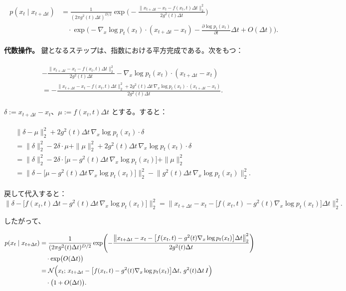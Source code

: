 \begin{align*}
\begin{aligned}
p(x_t\mid x_{t+\Delta t})
&= \frac{1}{(2\pi g^2(t)\Delta t)^{D/2}}
\exp\Biggl(
-\frac{\|x_{t+\Delta t}-x_t-f(x_t,t)\Delta t\|_2^2}{2g^2(t)\Delta t}
\Biggr) \\
&\quad\cdot\exp\Biggl(
-\nabla_x\log p_t(x_t)\cdot(x_{t+\Delta t}-x_t)
-\frac{\partial\log p_t(x_t)}{\partial t}\Delta t
+ O(\Delta t)
\Biggr).
\end{aligned}
\end{align*}


\textbf{代数操作。} 鍵となるステップは、指数における平方完成である。次をもつ：

\begin{align*}
\begin{aligned}
&-\frac{\|x_{t+\Delta t}-x_t-f(x_t,t)\Delta t\|_2^2}{2g^2(t)\Delta t}
-\nabla_x\log p_t(x_t)\cdot(x_{t+\Delta t}-x_t) \\
&= -\frac{
\bigl\|x_{t+\Delta t}-x_t-f(x_t,t)\Delta t\bigr\|_2^2
+ 2g^2(t)\Delta t\,\nabla_x\log p_t(x_t)\cdot(x_{t+\Delta t}-x_t)
}{2g^2(t)\Delta t}.
\end{aligned}
\end{align*}


$\delta:=x_{t+\Delta t}-x_t$、$\mu:=f(x_t,t)\Delta t$ とする。すると：

\begin{align*}
\begin{aligned}
&\|\delta-\mu\|_2^2 + 2g^2(t)\Delta t\,\nabla_x\log p_t(x_t)\cdot\delta \\
&= \|\delta\|_2^2 - 2\delta\cdot\mu + \|\mu\|_2^2
+ 2g^2(t)\Delta t\,\nabla_x\log p_t(x_t)\cdot\delta \\
&= \|\delta\|_2^2
- 2\delta\cdot\bigl[\mu-g^2(t)\Delta t\,\nabla_x\log p_t(x_t)\bigr]
+ \|\mu\|_2^2 \\
&= \bigl\|\delta-\bigl[\mu-g^2(t)\Delta t\,\nabla_x\log p_t(x_t)\bigr]\bigr\|_2^2
- \bigl\|g^2(t)\Delta t\,\nabla_x\log p_t(x_t)\bigr\|_2^2.
\end{aligned}
\end{align*}


戻して代入すると：
\[
\|\delta-\bigl[f(x_t,t)\Delta t-g^2(t)\Delta t\,\nabla_x\log p_t(x_t)\bigr]\|_2^2
=\bigl\|x_{t+\Delta t}-x_t-\bigl[f(x_t,t)-g^2(t)\nabla_x\log p_t(x_t)\bigr]\Delta t\bigr\|_2^2.
\]


したがって、

\begin{align*}
\begin{aligned}
p(x_t\mid x_{t+\Delta t})
&= \frac{1}{(2\pi g^2(t)\Delta t)^{D/2}}
\exp\Biggl(
-\frac{
\bigl\|x_{t+\Delta t}-x_t-\bigl[f(x_t,t)-g^2(t)\nabla_x\log p_t(x_t)\bigr]\Delta t\bigr\|_2^2
}{2g^2(t)\Delta t}
\Biggr) \\
&\quad\cdot\exp\bigl(O(\Delta t)\bigr) \\
&= \mathcal{N}\Bigl(
x_t;\,
x_{t+\Delta t}-\bigl[f(x_t,t)-g^2(t)\nabla_x\log p_t(x_t)\bigr]\Delta t,\,
g^2(t)\Delta t\, I
\Bigr) \\
&\quad\cdot\bigl(1+O(\Delta t)\bigr).
\end{aligned}
\end{align*}


